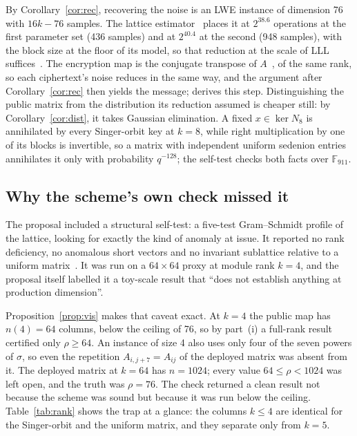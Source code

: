 \documentclass[11pt]{article}
\makeatletter
\theoremstyle{remark}
\newcommand{\F}{\mathbb{F}}
\DeclareRobustCommand{\_}{%
  \edef\@tempa{\ttdefault}%
  \ifx\f@family\@tempa\char95 \else\textunderscore\fi\penalty300\relax}
\makeatother
\begin{document}
By Corollary~\ref{cor:rec}, recovering the noise is an LWE instance of dimension 76 with $16k-76$ samples. The lattice
estimator~\cite{APS15,estimator} places it at $2^{38.6}$ operations at the first parameter set (436 samples) and at
$2^{40.4}$ at the second (948 samples), with the block size at the floor of its model, so that reduction at the scale of
LLL suffices~\cite{GifNote}. The encryption map is the conjugate transpose of $A$~\cite{GifNote}, of the same rank, so
each ciphertext's noise reduces in the same way, and the argument after Corollary~\ref{cor:rec} then yields the message;
\cite{GifNote} derives this step. Distinguishing the public
matrix from the distribution its reduction assumed is cheaper still: by Corollary~\ref{cor:dist}, it takes Gaussian
elimination. A fixed $x\in\ker N_8$ is annihilated by every Singer-orbit key at $k=8$, while right multiplication by one
of its blocks is invertible, so a matrix with independent uniform sedenion entries annihilates it only with probability
$q^{-128}$; the self-test checks both facts over $\F_{911}$.

\subsection{Why the scheme's own check missed it}\label{sec:missed}

The proposal included a structural self-test: a five-test Gram--Schmidt profile of the lattice, looking for exactly the
kind of anomaly at issue. It reported no rank deficiency, no anomalous short vectors and no invariant sublattice
relative to a uniform matrix~\cite{GifFLT}. It was run on a $64\times64$ proxy at module rank $k=4$, and the proposal
itself labelled it a toy-scale result that ``does not establish anything at production dimension''.

Proposition~\ref{prop:vis} makes that caveat exact. At $k=4$ the public map has $n(4)=64$ columns, below the ceiling of
76, so by part~(i) a full-rank result certified only $\rho\ge64$. An instance of size 4 also uses only four of the seven
powers of $\sigma$, so even the repetition $A_{i,j+7}=A_{ij}$ of the deployed matrix was absent from it. The deployed
matrix at $k=64$ has $n=1024$; every value $64\le\rho<1024$ was left open, and the truth was $\rho=76$. The check returned
a clean result not because the scheme was sound but because it was run below the ceiling. Table~\ref{tab:rank} shows the
trap at a glance: the columns $k\le4$ are identical for the Singer-orbit and the uniform matrix, and they separate only
from $k=5$.
\end{document}
